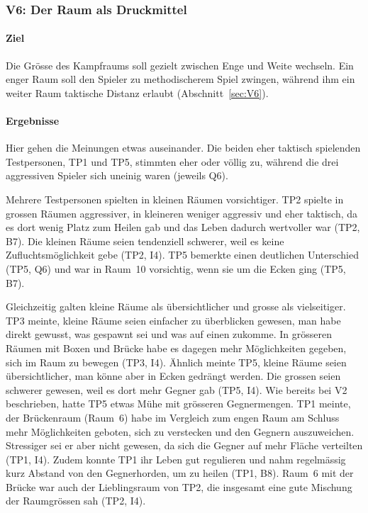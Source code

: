\documentclass[../Main.tex]{subfiles}
\begin{document}
\subsubsection{V6: Der Raum als Druckmittel}

\paragraph{Ziel}
Die Grösse des Kampfraums soll gezielt zwischen Enge und Weite wechseln. Ein enger Raum soll den Spieler zu methodischerem Spiel zwingen, während ihm ein weiter Raum taktische Distanz erlaubt (Abschnitt~\ref{sec:V6}).

\paragraph{Ergebnisse}
Hier gehen die Meinungen etwas auseinander. Die beiden eher taktisch spielenden Testpersonen, TP1 und TP5, stimmten eher oder völlig zu, während die drei aggressiven Spieler sich uneinig waren (jeweils Q6).

Mehrere Testpersonen spielten in kleinen Räumen vorsichtiger. TP2 spielte in grossen Räumen aggressiver, in kleineren weniger aggressiv und eher taktisch, da es dort wenig Platz zum Heilen gab und das Leben dadurch wertvoller war (TP2, B7). Die kleinen Räume seien tendenziell schwerer, weil es keine Zufluchtsmöglichkeit gebe (TP2, I4). TP5 bemerkte einen deutlichen Unterschied (TP5, Q6) und war in Raum~10 vorsichtig, wenn sie um die Ecken ging (TP5, B7).

Gleichzeitig galten kleine Räume als übersichtlicher und grosse als vielseitiger. TP3 meinte, kleine Räume seien einfacher zu überblicken gewesen, man habe direkt gewusst, was gespawnt sei und was auf einen zukomme. In grösseren Räumen mit Boxen und Brücke habe es dagegen mehr Möglichkeiten gegeben, sich im Raum zu bewegen (TP3, I4). Ähnlich meinte TP5, kleine Räume seien übersichtlicher, man könne aber in Ecken gedrängt werden. Die grossen seien schwerer gewesen, weil es dort mehr Gegner gab (TP5, I4). Wie bereits bei V2 beschrieben, hatte TP5 etwas Mühe mit grösseren Gegnermengen. TP1 meinte, der Brückenraum (Raum~6) habe im Vergleich zum engen Raum am Schluss mehr Möglichkeiten geboten, sich zu verstecken und den Gegnern auszuweichen. Stressiger sei er aber nicht gewesen, da sich die Gegner auf mehr Fläche verteilten (TP1, I4). Zudem konnte TP1 ihr Leben gut regulieren und nahm regelmässig kurz Abstand von den Gegnerhorden, um zu heilen (TP1, B8). Raum~6 mit der Brücke war auch der Lieblingsraum von TP2, die insgesamt eine gute Mischung der Raumgrössen sah (TP2, I4).
\end{document}

